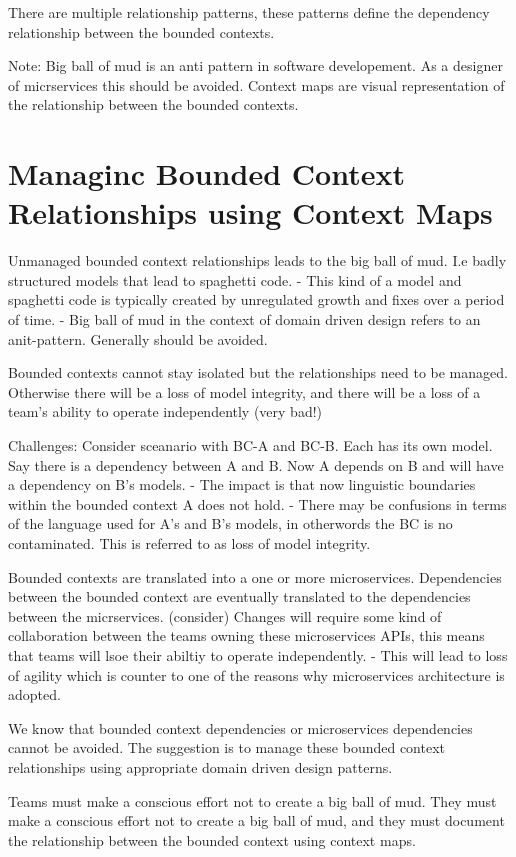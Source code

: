 There are multiple relationship patterns, these patterns define the dependency relationship between the bounded contexts.

Note:
Big ball of mud is an anti pattern in software developement. As a designer of micrservices this should be avoided.
Context maps are visual representation of the relationship between the bounded contexts.

\section{Managinc Bounded Context Relationships using Context Maps}
Unmanaged bounded context relationships leads to the big ball of mud. I.e badly structured models that lead to spaghetti code.
- This kind of a model and spaghetti code is typically created by unregulated growth and fixes over a period of time.
- Big ball of mud in the context of domain driven design refers to an anit-pattern. Generally should be avoided.

Bounded contexts cannot stay isolated but the relationships need to be managed.
Otherwise there will be a loss of model integrity, and there will be a loss of a team's ability to operate independently (very bad!)

Challenges:
Consider sceanario with BC-A and BC-B. Each has its own model.
Say there is a dependency between A and B. Now A depends on B and will have a dependency on B's models.
- The impact is that now linguistic boundaries within the bounded context A does not hold.
- There may be confusions in terms of the language used for A's and B's models, in otherwords the BC is no contaminated. This is referred to as loss of model integrity.

Bounded contexts are translated into a one or more microservices.
Dependencies between the bounded context are eventually translated to the dependencies between the micrservices. (consider)
Changes will require some kind of collaboration between the teams owning these microservices APIs, this means that teams will lsoe their abiltiy to operate independently.
- This will lead to loss of agility which is counter to one of the reasons why microservices architecture is adopted.

We know that bounded context dependencies or microservices dependencies cannot be avoided.
The suggestion is to manage these bounded context relationships using appropriate domain driven design patterns.

Teams must make a conscious effort not to create a big ball of mud.
They must make a conscious effort not to create a big ball of mud, and they must document the relationship between the bounded context using context maps.

